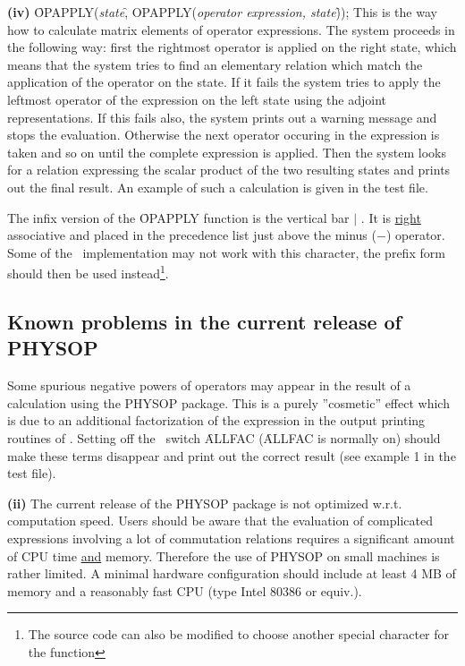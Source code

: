 {\bf (iv)} \f{OPAPPLY(}{\it state}\f{, OPAPPLY(}{\it operator expression,
state}\f{))}; This is the way how to calculate matrix elements of
operator
expressions. The system proceeds in the following way: first the
rightmost operator is applied on the right state, which means that the
system tries
to find an elementary relation which match the application of the
operator on the state. If it fails
the system tries to apply the leftmost operator of the expression on the
left state using the adjoint representations. If this fails also,
the system prints out a warning message and stops the evaluation.
Otherwise the next operator occuring in the expression is
taken and so on until the complete expression is applied.  Then the
system
looks for a relation expressing the scalar product of the two
resulting states and prints out the final result. An example of such
a calculation is given in the test file.

The infix version of the \f{OPAPPLY} function is the vertical bar $\mid$
. It is \underline{right} associative and placed in the precedence
list just above the minus ($-$) operator.
Some of the \REDUCE\ implementation may not work with this character,
the prefix form should then be used instead\footnote{The source code
can also be modified to choose another special character for the
function}.

\subsection{Known problems in the current release of PHYSOP}

 Some spurious negative powers  of operators
may appear
in the result of a calculation using the PHYSOP package. This is a
purely ''cosmetic'' effect which is due to an additional
factorization of the expression in the output printing routines of
\REDUCE. Setting off the \REDUCE\ switch \f{ALLFAC}  (\f{ALLFAC} is normally
on)
should make these
terms disappear and print out the correct result (see example 1
in the test file).

{\bf (ii)} The current release of the PHYSOP package is not optimized
w.r.t. computation speed. Users should be aware that the evaluation
of complicated expressions involving a lot of commutation relations
requires a significant amount of CPU time \underline{and} memory.
Therefore the use of PHYSOP on small machines is rather limited. A
minimal hardware configuration should include at least 4 MB of
memory and a reasonably fast CPU (type Intel 80386 or equiv.).

